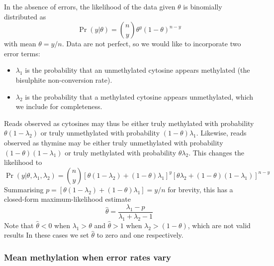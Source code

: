 \documentclass[12pt,longbibliography]{article}
\begin{document}
In the absence of errors, the likelihood of the data given $\theta$ is binomially distributed as
\begin{equation}
    \label{eqn:classic-binomial}
    \Pr(y| \theta) = {n \choose y} \theta^y(1-\theta)^{n-y}
\end{equation}
with mean $\theta=y/n$.
Data are not perfect, so we would like to incorporate two error terms:
\begin{itemize}
    \item $\lambda_1$ is the probability that an unmethylated cytosine appears methylated (the bisulphite non-conversion rate).
    \item $\lambda_2$ is the probability that a methylated cytosine appears unmethylated, which we include for completeness.
\end{itemize}
Reads observed as cytosines may thus be either truly methylated with probability $\theta(1-\lambda_2)$ or truly unmethylated with probability $(1-\theta)\lambda_1$. Likewise, reads observed as thymine may be either truly unmethylated with probability $(1-\theta)(1-\lambda_1)$ or truly methylated with probability $\theta \lambda_2$.
This changes the likelihood to
\begin{equation}
    \label{eqn:binom-with-errors}
    \Pr(y | \theta, \lambda_1, \lambda_2) = 
    {n \choose y}
    [\theta(1-\lambda_2) + (1-\theta)\lambda_1]^y
    [\theta \lambda_2 + (1-\theta)(1-\lambda_1)]^{n-y}
\end{equation}
Summarising $p=[\theta(1-\lambda_2) + (1-\theta)\lambda_1] = y/n$ for brevity, this has a closed-form maximum-likelihood estimate
\begin{equation}
    \label{eqn:ml-theta}
    \hat{\theta} = \frac{\lambda_1-p}{\lambda_1 + \lambda_2 -1}
\end{equation}
Note that $\hat{\theta}<0$ when $\lambda_1 > \theta$ and $\hat{\theta}>1$ when $\lambda_2 > (1-\theta)$, which are not valid results
In these cases we set $\hat{\theta}$ to zero and one respectively.

\subsubsection{Mean methylation when error rates vary} \label{sec:mean-as-beta}
\end{document}
